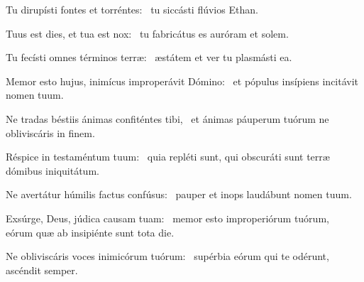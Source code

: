 \item Tu dirupísti fontes et torréntes:~\psstar{} tu siccásti flúvios Ethan.

\item Tuus est dies, et tua est nox:~\psstar{} tu fabricátus es auróram et solem.

\item Tu fecísti omnes términos terræ:~\psstar{} æstátem et ver tu plasmásti ea.

\item Memor esto hujus, inimícus improperávit Dómino:~\psstar{} et pópulus insípiens incitávit nomen tuum.

\item Ne tradas béstiis ánimas confiténtes tibi,~\psstar{} et ánimas páuperum tuórum ne obliviscáris in finem.

\item Réspice in testaméntum tuum:~\psstar{} quia repléti sunt, qui obscuráti sunt terræ dómibus iniquitátum.

\item Ne avertátur húmilis factus confúsus:~\psstar{} pauper et inops laudábunt nomen tuum.

\item Exsúrge, Deus, júdica causam tuam:~\pscross{} memor esto improperiórum tuórum,~\psstar{} eórum quæ ab insipiénte sunt tota die.

\item Ne obliviscáris voces inimicórum tuórum:~\psstar{} supérbia eórum qui te odérunt, ascéndit semper.